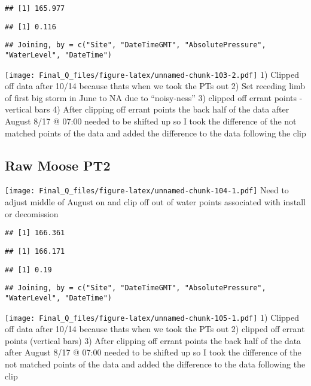 \documentclass[
]{article}
\begin{document}
\begin{verbatim}
## [1] 165.977
\end{verbatim}

\begin{verbatim}
## [1] 0.116
\end{verbatim}

\begin{verbatim}
## Joining, by = c("Site", "DateTimeGMT", "AbsolutePressure", "WaterLevel", "DateTime")
\end{verbatim}

\texttt{[image: Final\_Q\_files/figure-latex/unnamed-chunk-103-2.pdf]} 1)
Clipped off data after 10/14 because thats when we took the PTs out 2)
Set receding limb of first big storm in June to NA due to ``noisy-ness''
3) clipped off errant points - vertical bars 4) After clipping off
errant points the back half of the data after August 8/17 @ 07:00 needed
to be shifted up so I took the difference of the not matched points of
the data and added the difference to the data following the clip

\hypertarget{raw-moose-pt2}{%
\subsection{Raw Moose PT2}\label{raw-moose-pt2}}

\texttt{[image: Final\_Q\_files/figure-latex/unnamed-chunk-104-1.pdf]}
Need to adjust middle of August on and clip off out of water points
associated with install or decomission

\begin{verbatim}
## [1] 166.361
\end{verbatim}

\begin{verbatim}
## [1] 166.171
\end{verbatim}

\begin{verbatim}
## [1] 0.19
\end{verbatim}

\begin{verbatim}
## Joining, by = c("Site", "DateTimeGMT", "AbsolutePressure", "WaterLevel", "DateTime")
\end{verbatim}

\texttt{[image: Final\_Q\_files/figure-latex/unnamed-chunk-105-1.pdf]} 1)
Clipped off data after 10/14 because thats when we took the PTs out 2)
clipped off errant points (vertical bars) 3) After clipping off errant
points the back half of the data after August 8/17 @ 07:00 needed to be
shifted up so I took the difference of the not matched points of the
data and added the difference to the data following the clip
\end{document}

